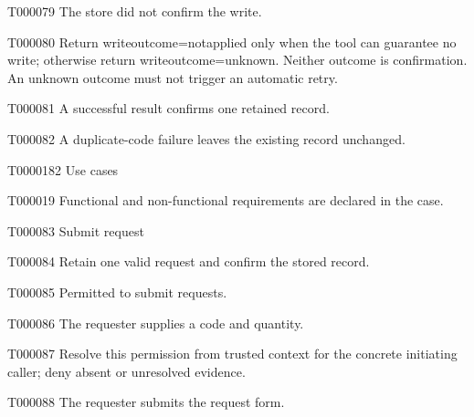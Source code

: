 \documentclass[11pt,a4paper]{article}
\begin{document}
\begin{atlasparagraph}{T000079}
The store did not confirm the write.
\end{atlasparagraph}
\begin{atlasparagraph}{T000080}
Return write\AtlasCharUnderscore{}outcome=not\AtlasCharUnderscore{}applied only when the tool can guarantee no write; otherwise return write\AtlasCharUnderscore{}outcome=unknown. Neither outcome is confirmation. An unknown outcome must not trigger an automatic retry.
\end{atlasparagraph}
\begin{atlasparagraph}{T000081}
A successful result confirms one retained record.
\end{atlasparagraph}
\begin{atlasparagraph}{T000082}
A duplicate-code failure leaves the existing record unchanged.
\end{atlasparagraph}
\begin{atlasheading}{T000018}{2}
Use cases
\end{atlasheading}
\begin{atlasparagraph}{T000019}
Functional and non-functional requirements are declared in the case.
\end{atlasparagraph}
\begin{atlastext}{T000083}
Submit request
\end{atlastext}
\begin{atlasparagraph}{T000084}
Retain one valid request and confirm the stored record.
\end{atlasparagraph}
\begin{atlastext}{T000085}
Permitted to submit requests.
\end{atlastext}
\begin{atlasparagraph}{T000086}
The requester supplies a code and quantity.
\end{atlasparagraph}
\begin{atlasparagraph}{T000087}
Resolve this permission from trusted context for the concrete initiating caller; deny absent or unresolved evidence.
\end{atlasparagraph}
\begin{atlasparagraph}{T000088}
The requester submits the request form.
\end{atlasparagraph}
\end{document}
